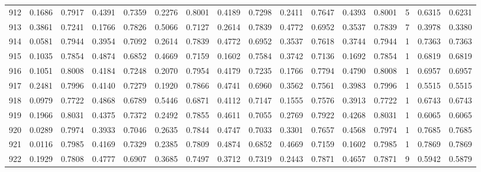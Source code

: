\begin{tabular}{lrrrrrrrrrrrrrrr}
912 &      0.1686 &  0.7917 &  0.4391 &  0.7359 &  0.2276 &  0.8001 &  0.4189 &  0.7298 &  0.2411 &  0.7647 &   0.4393 &     0.8001 &      5 &                    0.6315 &                     0.6231 \\
913 &      0.3861 &  0.7241 &  0.1766 &  0.7826 &  0.5066 &  0.7127 &  0.2614 &  0.7839 &  0.4772 &  0.6952 &   0.3537 &     0.7839 &      7 &                    0.3978 &                     0.3380 \\
914 &      0.0581 &  0.7944 &  0.3954 &  0.7092 &  0.2614 &  0.7839 &  0.4772 &  0.6952 &  0.3537 &  0.7618 &   0.3744 &     0.7944 &      1 &                    0.7363 &                     0.7363 \\
915 &      0.1035 &  0.7854 &  0.4874 &  0.6852 &  0.4669 &  0.7159 &  0.1602 &  0.7584 &  0.3742 &  0.7136 &   0.1692 &     0.7854 &      1 &                    0.6819 &                     0.6819 \\
916 &      0.1051 &  0.8008 &  0.4184 &  0.7248 &  0.2070 &  0.7954 &  0.4179 &  0.7235 &  0.1766 &  0.7794 &   0.4790 &     0.8008 &      1 &                    0.6957 &                     0.6957 \\
917 &      0.2481 &  0.7996 &  0.4140 &  0.7279 &  0.1920 &  0.7866 &  0.4741 &  0.6960 &  0.3562 &  0.7561 &   0.3983 &     0.7996 &      1 &                    0.5515 &                     0.5515 \\
918 &      0.0979 &  0.7722 &  0.4868 &  0.6789 &  0.5446 &  0.6871 &  0.4112 &  0.7147 &  0.1555 &  0.7576 &   0.3913 &     0.7722 &      1 &                    0.6743 &                     0.6743 \\
919 &      0.1966 &  0.8031 &  0.4375 &  0.7372 &  0.2492 &  0.7855 &  0.4611 &  0.7055 &  0.2769 &  0.7922 &   0.4268 &     0.8031 &      1 &                    0.6065 &                     0.6065 \\
920 &      0.0289 &  0.7974 &  0.3933 &  0.7046 &  0.2635 &  0.7844 &  0.4747 &  0.7033 &  0.3301 &  0.7657 &   0.4568 &     0.7974 &      1 &                    0.7685 &                     0.7685 \\
921 &      0.0116 &  0.7985 &  0.4169 &  0.7329 &  0.2385 &  0.7809 &  0.4874 &  0.6852 &  0.4669 &  0.7159 &   0.1602 &     0.7985 &      1 &                    0.7869 &                     0.7869 \\
922 &      0.1929 &  0.7808 &  0.4777 &  0.6907 &  0.3685 &  0.7497 &  0.3712 &  0.7319 &  0.2443 &  0.7871 &   0.4657 &     0.7871 &      9 &                    0.5942 &                     0.5879 \\

\end{tabular}

